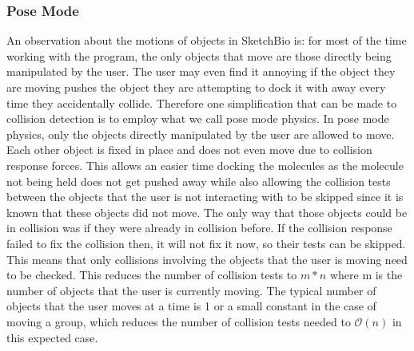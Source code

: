 \documentclass{article} %
\begin{document}
\subsubsection{Pose Mode}
An observation about the motions of objects in SketchBio is: for most of the time working with the program, the only objects that move are those directly being manipulated by the user.  The user may even find it annoying if the object they are moving pushes the object they are attempting to dock it with away every time they accidentally collide.  Therefore one simplification that can be made to collision detection is to employ what we call pose mode physics.  In pose mode physics, only the objects directly manipulated by the user are allowed to move.  Each other object is fixed in place and does not even move due to collision response forces.  This allows an easier time docking the molecules as the molecule not being held does not get pushed away while also allowing the collision tests between the objects that the user is not interacting with to be skipped since it is known that these objects did not move.  The only way that those objects could be in collision was if they were already in collision before.  If the collision response failed to fix the collision then, it will not fix it now, so their tests can be skipped.  This means that only collisions involving the objects that the user is moving need to be checked.  This reduces the number of collision tests to $m*n$ where m is the number of objects that the user is currently moving.  The typical number of objects that the user moves at a time is 1 or a small constant in the case of moving a group, which reduces the number of collision tests needed to $\mathcal{O}(n)$ in this expected case.
\end{document}
